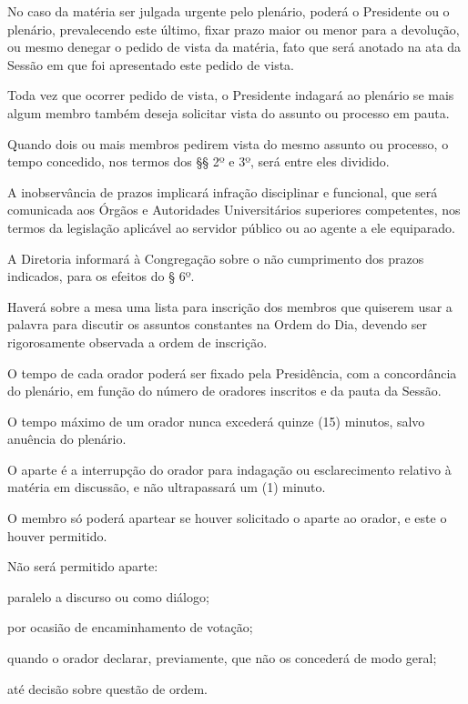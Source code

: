 \documentclass{documento}
\begin{document}
\paragrafo No caso da matéria ser julgada urgente pelo plenário, poderá o Presidente ou o plenário, prevalecendo este último, fixar prazo maior ou menor para a devolução, ou mesmo denegar o pedido de vista da matéria, fato que será anotado na ata da Sessão em que foi apresentado este pedido de vista.

\paragrafo Toda vez que ocorrer pedido de vista, o Presidente indagará ao plenário se mais algum membro também deseja solicitar vista do assunto ou processo em pauta.

\paragrafo Quando dois ou mais membros pedirem vista do mesmo assunto ou processo, o tempo concedido, nos termos dos §§ 2º e 3º, será entre eles dividido.

\paragrafo A inobservância de prazos implicará infração disciplinar e funcional, que será comunicada aos Órgãos e Autoridades Universitários superiores competentes, nos termos da legislação aplicável ao servidor público ou ao agente a ele equiparado. 

\paragrafo A Diretoria informará à Congregação sobre o não cumprimento dos prazos indicados, para os efeitos do § 6º.


\artigo Haverá sobre a mesa uma lista para inscrição dos membros que quiserem usar a palavra para discutir os assuntos constantes na Ordem do Dia, devendo ser rigorosamente observada a ordem de inscrição.

\artigo O tempo de cada orador poderá ser fixado pela Presidência, com a concordância do plenário, em função do número de oradores inscritos e da pauta da Sessão.

\paragrafounico O tempo máximo de um orador nunca excederá quinze (15) minutos, salvo anuência do plenário.

\artigo O aparte é a interrupção do orador para indagação ou esclarecimento relativo à matéria em discussão, e não ultrapassará um (1) minuto.

\paragrafo O membro só poderá apartear se houver solicitado o aparte ao orador, e este o houver permitido.

\paragrafo Não será permitido aparte:

\inciso paralelo a discurso ou como diálogo;

\inciso por ocasião de encaminhamento de votação;

\inciso quando o orador declarar, previamente, que não os concederá de modo geral;

\inciso até decisão sobre questão de ordem.
\end{document}
